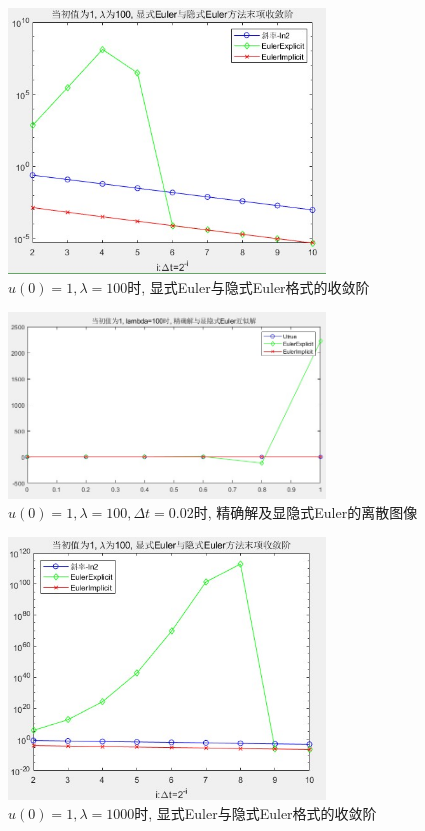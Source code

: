 \documentclass[12pt]{article}
\begin{document}
\begin{figure}[H]
	\centering
	\includegraphics[width=0.75\textwidth]{10}
	\caption{$u(0)=1, \lambda=100$时, 显式Euler与隐式Euler格式的收敛阶}
\end{figure}
\begin{figure}[H]
	\centering
	\includegraphics[width=0.75\textwidth]{11}
	\caption{$u(0)=1, \lambda=100,\Delta{t}=0.02$时, 精确解及显隐式Euler的离散图像}
\end{figure}
\begin{figure}[H]
	\centering
	\includegraphics[width=0.75\textwidth]{12}
	\caption{$u(0)=1, \lambda=1000$时, 显式Euler与隐式Euler格式的收敛阶}
\end{figure}
\end{document}
